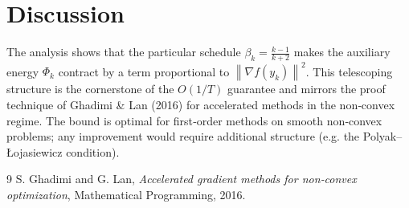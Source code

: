 \documentclass{article}
\newcommand{\grad}{\nabla}
\newcommand{\norm}[1]{\left\|#1\right\|}
\begin{document}
\section*{Discussion}
The analysis shows that the particular schedule $\beta_k=\frac{k-1}{k+2}$ makes the auxiliary energy $\Phi_k$ contract by a term proportional to $\norm{\grad f(y_k)}^{2}$.  This telescoping structure is the cornerstone of the $O(1/T)$ guarantee and mirrors the proof technique of Ghadimi \& Lan (2016) for accelerated methods in the non‑convex regime.  The bound is optimal for first‑order methods on smooth non‑convex problems; any improvement would require additional structure (e.g. the Polyak–Łojasiewicz condition).

\begin{thebibliography}{9}
S. Ghadimi and G. Lan, 
\emph{Accelerated gradient methods for non‑convex optimization}, 
Mathematical Programming, 2016.
\end{thebibliography}
\end{document}
